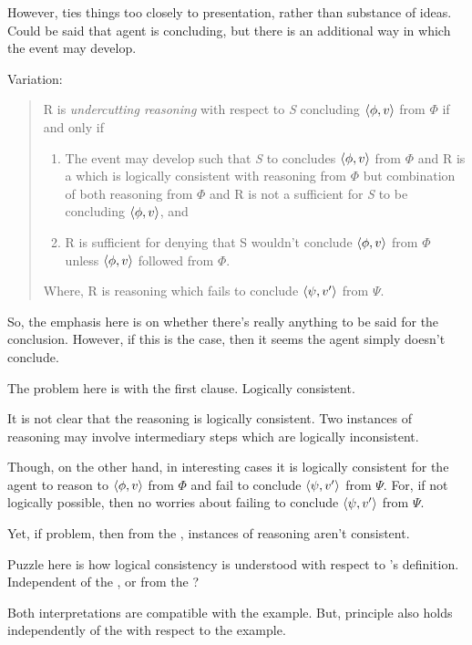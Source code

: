 \begin{note}
  However, ties things too closely to presentation, rather than substance of ideas.
  Could be said that agent is concluding, but there is an additional way in which the event may develop.

  Variation:
  \begin{quote}
    R is \emph{undercutting reasoning} with respect to \emph{S} concluding \(\langle \phi, v \rangle\) from \(\Phi\) if and only if
    \begin{enumerate}[label=(UR\arabic*), ref=(UR\arabic*)]
    \item
      The event may develop such that \emph{S} to concludes \(\langle \phi, v \rangle\) from \(\Phi\) and R is a \pevent{} which is logically consistent with reasoning from \(\Phi\) but combination of both reasoning from \(\Phi\) and R is not a sufficient for \emph{S} to be concluding \(\langle \phi, v \rangle\), and
    \item
      R is sufficient for denying that S wouldn't conclude \(\langle \phi, v \rangle\) from \(\Phi\) unless \(\langle \phi, v \rangle\) followed from \(\Phi\).%
    \end{enumerate}
    Where, R is reasoning which fails to conclude \(\langle \psi, v' \rangle\) from \(\Psi\).
  \end{quote}

  {
    \color{red}
    So, the emphasis here is on whether there's really anything to be said for the conclusion.
    However, if this is the case, then it seems the agent simply doesn't conclude.
  }

  The problem here is with the first clause.
  Logically consistent.

  It is not clear that the reasoning is logically consistent.
  Two instances of reasoning may involve intermediary steps which are logically inconsistent.

  Though, on the other hand, in interesting cases it is logically consistent for the agent to reason to \(\langle \phi, v \rangle\) from \(\Phi\) and fail to conclude \(\langle \psi, v' \rangle\) from \(\Psi\).
  For, if not logically possible, then no worries about failing to conclude \(\langle \psi, v' \rangle\) from \(\Psi\).

  Yet, if problem, then from the \agpe{}, instances of reasoning aren't consistent.

  Puzzle here is how logical consistency is understood with respect to \citeauthor{Pollock:1987un}'s definition.
  Independent of the \agpe{}, or from the \agpe{}?

  Both interpretations are compatible with the example.
  But, principle also holds independently of the \agpe{} with respect to the example.
\end{note}

